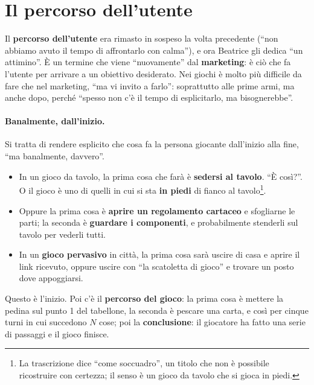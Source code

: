 \section{Il percorso dell'utente}
\label{a9:sec:percorso}



Il \textbf{percorso dell'utente} era rimasto in sospeso la volta precedente (``non
abbiamo avuto il tempo di affrontarlo con calma''), e ora Beatrice gli dedica ``un
attimino''. È un termine che viene ``nuovamente'' dal \textbf{marketing}: è ciò che
fa l'utente per arrivare a un obiettivo desiderato. Nei giochi è molto più difficile
da fare che nel marketing, ``ma vi invito a farlo'': soprattutto alle prime armi, ma
anche dopo, perché ``spesso non c'è il tempo di esplicitarlo, ma bisognerebbe''.

\paragraph{Banalmente, dall'inizio.} Si tratta di rendere esplicito che cosa fa la
persona giocante dall'inizio alla fine, ``ma banalmente, davvero''.
\begin{itemize}
  \item In un gioco da tavolo, la prima cosa che farà è \textbf{sedersi al tavolo}.
        ``È così?''. O il gioco è uno di quelli in cui si sta \textbf{in piedi} di
        fianco al tavolo\footnote{La trascrizione dice ``come soccuadro'', un titolo
        che non è possibile ricostruire con certezza; il senso è un gioco da tavolo
        che si gioca in piedi.}.
  \item Oppure la prima cosa è \textbf{aprire un regolamento cartaceo} e sfogliarne le
        parti; la seconda è \textbf{guardare i componenti}, e probabilmente
        stenderli sul tavolo per vederli tutti.
  \item In un \textbf{gioco pervasivo} in città, la prima cosa sarà uscire di casa e
        aprire il link ricevuto, oppure uscire con ``la scatoletta di gioco'' e
        trovare un posto dove appoggiarsi.
\end{itemize}
Questo è l'inizio. Poi c'è il \textbf{percorso del gioco}: la prima cosa è mettere la
pedina sul punto 1 del tabellone, la seconda è pescare una carta, e così per cinque
turni in cui succedono $N$ cose; poi la \textbf{conclusione}: il giocatore ha fatto
una serie di passaggi e il gioco finisce.

